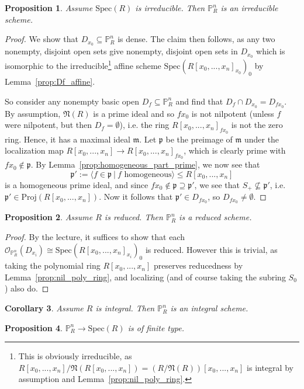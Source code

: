 \documentclass{scrartcl}
\renewcommand{\P}{\mathbb{P}}
\newcommand{\p}{\mathfrak{p}}
\newcommand{\m}{\mathfrak{m}}
\renewcommand{\m}{\mathfrak{m}}
\newcommand{\Nil}{\mathfrak{N}}
\newcommand{\Spec}{\mathrm{Spec}}
\newcommand{\Proj}{\mathrm{Proj}}
\renewcommand{\O}{\mathcal{O}}
\newtheorem{prop}{Proposition}
\newtheorem{corollary}[prop]{Corollary}
\theoremstyle{definition}
\begin{document}
\begin{prop}
    Assume $\Spec(R)$ is irreducible.
    Then $\P_R^n$ is an irreducible scheme.
\end{prop}
\begin{proof}
    We show that $D_{x_0} \subseteq \P_R^n$ is dense.
    The claim then follows, as any two nonempty, disjoint open sets give nonempty, disjoint open sets in $D_{x_0}$ which is isomorphic to the 
    irreducible\footnote{This is obviously irreducible, as $R[x_0, ..., x_n]/\Nil(R[x_0, ..., x_n]) = (R/\Nil(R))[x_0, ..., x_n]$ is integral by assumption and Lemma~\ref{prop:nil_poly_ring}.}
    affine scheme $\Spec(R[x_0, ..., x_n]_{x_0})_0$ by Lemma~\ref{prop:Df_affine}.

    So consider any nonempty basic open $D_f \subseteq \P_R^n$ and find that $D_f \cap D_{x_0} = D_{fx_0}$.
    By assumption, $\Nil(R)$ is a prime ideal and so $fx_0$ is not nilpotent (unless $f$ were nilpotent, but then $D_f = \emptyset$), i.e. the ring $R[x_0, ..., x_n]_{fx_0}$ is not the zero ring.
    Hence, it has a maximal ideal $\m$.
    Let $\p$ be the preimage of $\m$ under the localization map $R[x_0, ..., x_n] \to R[x_0, ..., x_n]_{fx_0}$, which is clearly prime with $fx_0 \notin \p$.
    By Lemma~\ref{prop:homogeneous_part_prime}, we now see that
    \begin{equation*}
        \p' := \langle f \in \p \ | \ \text{$f$ homogeneous} \rangle \leq R[x_0, ..., x_n]
    \end{equation*}
    is a homogeneous prime ideal, and since $fx_0 \notin \p \supseteq \p'$, we see that $S_+ \not\subseteq \p'$, i.e. $\p' \in \Proj(R[x_0, ..., x_n])$.
    Now it follows that $\p' \in D_{fx_0}$, so $D_{fx_0} \neq \emptyset$.
\end{proof}
\begin{prop}
    Assume $R$ is reduced.
    Then $\P_R^n$ is a reduced scheme.
\end{prop}
\begin{proof}
    By the lecture, it suffices to show that each $\O_{\P_R^n}(D_{x_i}) \cong \Spec(R[x_0, ..., x_n]_{x_i})_0$ is reduced.
    However this is trivial, as taking the polynomial ring $R[x_0, ..., x_n]$ preserves reducedness by Lemma~\ref{prop:nil_poly_ring}, and localizing (and of course taking the subring $S_0$) also do.
\end{proof}
\begin{corollary}
    Assume $R$ is integral.
    Then $\P_R^n$ is an integral scheme.
\end{corollary}
\begin{prop}
    $\P_R^n \to \Spec(R)$ is of finite type.
\end{prop}
\end{document}
